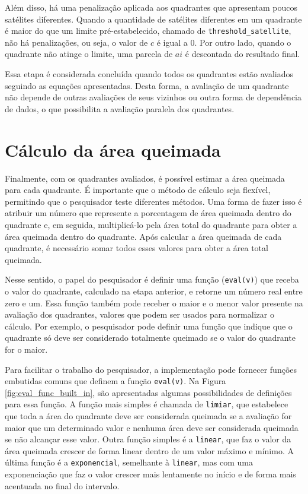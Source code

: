 \documentclass[cic,tc]{iiufrgs}
\begin{document}
Além disso, há uma penalização aplicada aos quadrantes que apresentam poucos satélites diferentes. Quando a quantidade de satélites diferentes em um quadrante é maior do que um limite pré-estabelecido, chamado de \texttt{threshold\_satellite}, não há penalizações, ou seja, o valor de $c$ é igual a 0. Por outro lado, quando o quadrante não atinge o limite, uma parcela de $ai$ é descontada do resultado final. 

Essa etapa é considerada concluída quando todos os quadrantes estão avaliados seguindo as equações apresentadas. Desta forma, a avaliação de um quadrante não depende de outras avaliações de seus vizinhos ou outra forma de dependência de dados, o que possibilita a avaliação paralela dos quadrantes.

\section{Cálculo da área queimada}
\label{sec:calculo_area_queimada}

Finalmente, com os quadrantes avaliados, é possível estimar a área queimada para cada quadrante. É importante que o método de cálculo seja flexível, permitindo que o pesquisador teste diferentes métodos. Uma forma de fazer isso é atribuir um número que represente a porcentagem de área queimada dentro do quadrante e, em seguida, multiplicá-lo pela área total do quadrante para obter a área queimada dentro do quadrante. Após calcular a área queimada de cada quadrante, é necessário somar todos esses valores para obter a área total queimada.

Nesse sentido, o papel do pesquisador é definir uma função (\texttt{eval(v)}) que receba o valor do quadrante, calculado na etapa anterior, e retorne um número real entre zero e um. Essa função também pode receber o maior e o menor valor presente na avaliação dos quadrantes, valores que podem ser usados para normalizar o cálculo. Por exemplo, o pesquisador pode definir uma função que indique que o quadrante só deve ser considerado totalmente queimado se o valor do quadrante for o maior.

Para facilitar o trabalho do pesquisador, a implementação pode fornecer funções embutidas comuns que definem a função \texttt{eval(v)}. Na Figura \ref{fig:eval_func_built_in}, são apresentadas algumas possibilidades de definições para essa função. A função mais simples é chamada de \texttt{limiar}, que estabelece que toda a área do quadrante deve ser considerada queimada se a avaliação for maior que um determinado valor e nenhuma área deve ser considerada queimada se não alcançar esse valor. Outra função simples é a \texttt{linear}, que faz o valor da área queimada crescer de forma linear dentro de um valor máximo e mínimo. A última função é a \texttt{exponencial}, semelhante à \texttt{linear}, mas com uma exponenciação que faz o valor crescer mais lentamente no início e de forma mais acentuada no final do intervalo.
\end{document}
